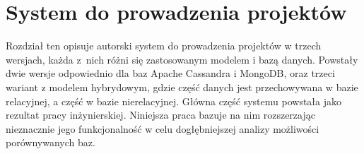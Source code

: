 \chapter{System do prowadzenia projektów}

Rozdział ten opisuje autorski system do prowadzenia projektów w trzech wersjach, każda z~nich różni się zastosowanym modelem i bazą danych.
Powstały dwie wersje odpowiednio dla baz Apache Cassandra i MongoDB, oraz trzeci wariant z modelem hybrydowym, gdzie część danych jest przechowywana w bazie relacyjnej, a część w bazie nierelacyjnej.
Główna część systemu powstała jako rezultat pracy inżynierskiej.
Niniejsza praca bazuje na nim rozszerzając nieznacznie jego funkcjonalność w celu dogłębniejszej analizy możliwości porównywanych baz.




